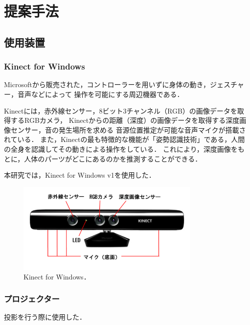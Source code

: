 \chapter{提案手法}
\thispagestyle{fancy}

\section{使用装置}
\subsection{Kinect for Windows}
Microsoftから販売された，コントローラーを用いずに身体の動き，ジェスチャー，音声などによって
操作を可能にする周辺機器である．

Kinectには，赤外線センサー，8ビット3チャンネル（RGB）の画像データを取得するRGBカメラ，
Kinectからの距離（深度）の画像データを取得する深度画像センサー，音の発生場所を求める
音源位置推定が可能な音声マイクが搭載されている．
また，Kinectの最も特徴的な機能が「姿勢認識技術」である，人間の全身を認識してその動きによる操作をしている．
これにより，深度画像をもとに，人体のパーツがどこにあるのかを推測することができる\cite{kinect}．

本研究では，Kinect for Windows v1を使用した．

\begin{figure}[b]
    \centering
    \includegraphics[width=9cm]{image/kinect.png}
    \caption[Kinect for Windows]{Kinect for Windows\cite{kinect}．}
  \label{kinect}
\end{figure}

\clearpage

\subsection{プロジェクター}
投影を行う際に使用した．

